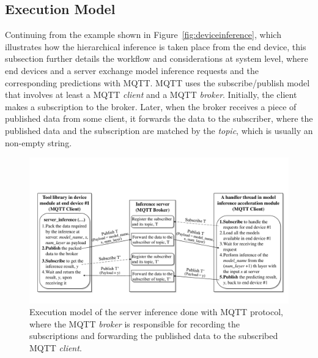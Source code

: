 \documentclass[conference]{IEEEtran}
\def\figurename{Figure}
\begin{document}

\subsection{Execution Model}
\label{sec:execmodel}
Continuing from the example shown in \figurename~\ref{fig:deviceinference}, which illustrates how the hierarchical inference is taken place from the end device, this subsection further details the workflow and considerations at system level, where end devices and a server exchange model inference requests and the corresponding predictions with MQTT. MQTT uses the subscribe/publish model that involves at least a MQTT \emph{client} and a MQTT \emph{broker}. Initially, the client makes a subscription to the broker. Later, when the broker receives a piece of published data from some client, it forwards the data to the subscriber, where the published data and the subscription are matched by the \emph{topic}, which is usually an non-empty string.

	\begin{figure}[htb!]
        \centering
        \includegraphics[width=\columnwidth]{figure/exe_model}
        \caption{Execution model of the server inference done with MQTT protocol, where the MQTT \emph{broker} is responsible for recording the subscriptions and forwarding the published data to the subscribed MQTT \emph{client}.}
        \label{fig:exemodel} %
    \end{figure}
\end{document}
